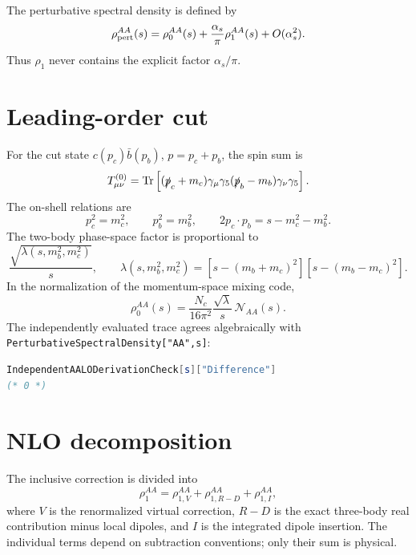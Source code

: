 \documentclass[11pt]{article}
\newcommand{\as}{\alpha_s}
\begin{document}
The perturbative spectral density is defined by
\begin{equation}
 \rho_{\rm pert}^{AA}(s)
 =\rho_0^{AA}(s)+\frac{\as}{\pi}\rho_1^{AA}(s)+O(\as^2).
\end{equation}
Thus \(\rho_1\) never contains the explicit factor \(\as/\pi\).

\section{Leading-order cut}

For the cut state \(c(p_c)\bar b(p_b)\), \(p=p_c+p_b\), the spin sum is
\begin{equation}
 T_{\mu\nu}^{(0)}
 =\mathrm{Tr}\left[
 (\slashed p_c+m_c)\gamma_\mu\gamma_5
 (\slashed p_b-m_b)\gamma_\nu\gamma_5
 \right].
\end{equation}
The on-shell relations are
\begin{equation}
 p_c^2=m_c^2,\qquad p_b^2=m_b^2,\qquad
 2p_c\cdot p_b=s-m_c^2-m_b^2.
\end{equation}
The two-body phase-space factor is proportional to
\begin{equation}
 \frac{\sqrt{\lambda(s,m_b^2,m_c^2)}}{s},\qquad
 \lambda(s,m_b^2,m_c^2)
 =[s-(m_b+m_c)^2][s-(m_b-m_c)^2].
\end{equation}
In the normalization of the momentum-space mixing code,
\begin{equation}
 \rho_0^{AA}(s)
 =\frac{N_c}{16\pi^2}\frac{\sqrt{\lambda}}{s}
 \,\mathcal N_{AA}(s).
\end{equation}
The independently evaluated trace agrees algebraically with
\texttt{PerturbativeSpectralDensity["AA",s]}:
\begin{lstlisting}[language=Mathematica]
IndependentAALODerivationCheck[s]["Difference"]
(* 0 *)
\end{lstlisting}

\section{NLO decomposition}

The inclusive correction is divided into
\begin{equation}
 \rho_1^{AA}
 =\rho_{1,V}^{AA}
 +\rho_{1,R-D}^{AA}
 +\rho_{1,I}^{AA},
\end{equation}
where \(V\) is the renormalized virtual correction, \(R-D\) is the exact
three-body real contribution minus local dipoles, and \(I\) is the integrated
dipole insertion.  The individual terms depend on subtraction conventions;
only their sum is physical.
\end{document}
